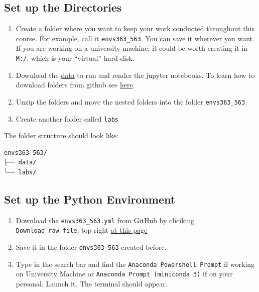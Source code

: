 \documentclass[
  letterpaper,
  DIV=11,
  numbers=noendperiod]{scrreprt}
\providecommand{\tightlist}{%
  \setlength{\itemsep}{0pt}\setlength{\parskip}{0pt}}\usepackage{longtable,booktabs,array}
\begin{document}
\subsection*{Set up the Directories}\label{set-up-the-directories}

\begin{enumerate}
\def\labelenumi{\arabic{enumi}.}
\tightlist
\item
  Create a folder where you want to keep your work conducted throughout
  this course. For example, call it \texttt{envs363\_563}. You can save
  it wherever you want. If you are working on a university machine, it
  could be worth creating it in \texttt{M:/}, which is your ``virtual''
  hard-disk.
\end{enumerate}

\begin{enumerate}
\def\labelenumi{\arabic{enumi}.}
\setcounter{enumi}{1}
\tightlist
\item
  Download the
  \href{https://github.com/pietrostefani/gds/tree/main/data}{data} to
  run and render the jupyter notebooks. To learn how to download folders
  from github see
  \href{https://pietrostefani.github.io/gds/download.html}{here}.
\item
  Unzip the folders and move the nested folders into the folder
  \texttt{envs363\_563}.
\item
  Create another folder called \texttt{labs}
\end{enumerate}

The folder structure should look like:

\begin{verbatim}
envs363_563/
├── data/
└── labs/
\end{verbatim}

\subsection*{Set up the Python
Environment}\label{set-up-the-python-environment}

\begin{enumerate}
\def\labelenumi{\arabic{enumi}.}
\tightlist
\item
  Download the \texttt{envs363\_563.yml} from GitHub by cliciking
  \texttt{Download\ raw\ file}, top right
  \href{https://github.com/pietrostefani/gds/blob/main/envs363-563.yml}{at
  this page}
\item
  Save it in the folder \texttt{envs363\_563} created before.
\item
  Type in the search bar and find the
  \texttt{Anaconda\ Powershell\ Prompt} if working on University Machine
  or \texttt{Anaconda\ Prompt\ (miniconda\ 3)} if on your personal.
  Launch it. The terminal should appear.
\end{enumerate}
\end{document}
